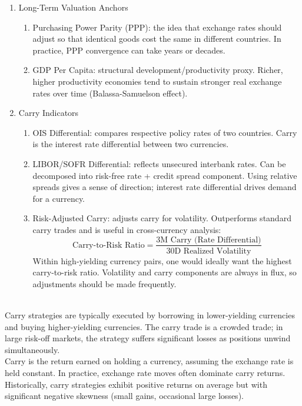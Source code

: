 \begin{remark}
\begin{enumerate}[label=\roman*.]
\begin{enumerate}[label=\arabic*.]
\item Current Account Balance: persistent deficits require capital inflows; sudden stops trigger sharp FX adjustment.
\item FX Reserves: adequacy (months of import cover, short-term debt coverage) determines policy space.
\end{enumerate}
\item Long-Term Valuation Anchors
\begin{enumerate}[label=\arabic*.]
\setlength{\itemsep}{0pt}
\item Purchasing Power Parity (PPP): the idea that exchange rates should adjust so that identical goods cost the same in different countries. In practice, PPP convergence can take years or decades.
\item GDP Per Capita: structural development/productivity proxy. Richer, higher productivity economies tend to sustain stronger real exchange rates over time (Balassa-Samuelson effect).
\end{enumerate}
\item Carry Indicators
\begin{enumerate}[label=\arabic*.]
\setlength{\itemsep}{0pt}
\item OIS Differential: compares respective policy rates of two countries. Carry is the interest rate differential between two currencies.
\item LIBOR/SOFR Differential: reflects unsecured interbank rates. Can be decomposed into risk-free rate + credit spread component. Using relative spreads gives a sense of direction; interest rate differential drives demand for a currency.
\item Risk-Adjusted Carry: adjusts carry for volatility. Outperforms standard carry trades and is useful in cross-currency analysis:
\begin{equation*}
\text{Carry-to-Risk Ratio} = \frac{\text{3M Carry (Rate Differential)}}{\text{30D Realized Volatility}}
\end{equation*}
Within high-yielding currency pairs, one would ideally want the highest carry-to-risk ratio. Volatility and carry components are always in flux, so adjustments should be made frequently.
\end{enumerate}
\end{enumerate}
\end{remark}

\begin{remark} \\
Carry strategies are typically executed by borrowing in lower-yielding currencies and buying higher-yielding currencies. The carry trade is a crowded trade; in large risk-off markets, the strategy suffers significant losses as positions unwind simultaneously.\\
Carry is the return earned on holding a currency, assuming the exchange rate is held constant. In practice, exchange rate moves often dominate carry returns. Historically, carry strategies exhibit positive returns on average but with significant negative skewness (small gains, occasional large losses).
\end{remark}

